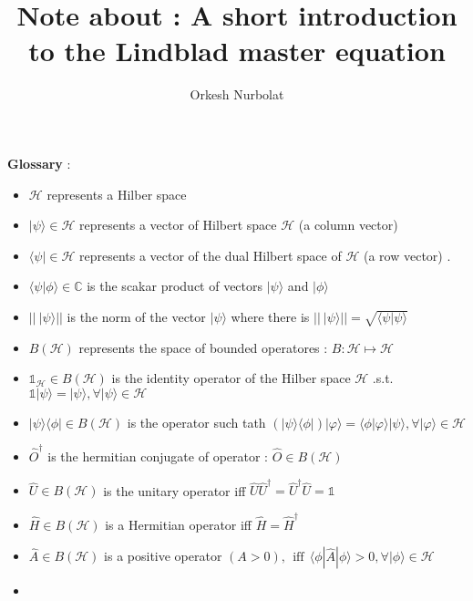 \title{Note about : A short introduction to the Lindblad master equation}
\author{Orkesh Nurbolat}
\maketitle
 \textbf{Glossary} : \\  
\begin{itemize}
\item 
 $ \mathcal{H } $  represents a Hilber space 
\item 
 $ |\psi \rangle \in \mathcal{H } $  represents a vector of Hilbert space
 $ \mathcal{H } $   (a column vector)
\item 
 $ \langle \psi |\in \mathcal{H } $  represents a vector of the dual Hilbert space of  
 $ \mathcal{H } $   (a row vector) . 
\item 
 $ {\langle \psi |\phi \rangle}\in \mathds{C } $  is the scakar product of vectors 
 $ |\psi \rangle  $  and
 $ |\phi \rangle  $ \item 
 $  ||\ |\psi \rangle ||  $  is the norm of the vector 
 $ |\psi \rangle  $  where there is 
 $  ||\ |\psi \rangle || =\sqrt{{\langle \psi |\psi \rangle}} $ \item 
 $ B (\mathcal{H }) $  represents the space of bounded operatores : 
 $ B :\mathcal{H }\mapsto \mathcal{H } $ \item 
 $ \mathds{1}_{\mathcal{H }}\in B (\mathcal{H }) $  is the identity operator of the Hilber space
 $ \mathcal{H } $  .s.t.
 $ \mathds{1}|\psi \rangle =|\psi \rangle ,\forall |\psi \rangle \in \mathcal{H } $ \item 
 $ |\psi \rangle \langle \phi |\in B (\mathcal{H }) $  is the operator such tath 
 $ (|\psi \rangle \langle \phi |)|\varphi \rangle ={\langle \phi |\varphi \rangle}|\psi \rangle ,\forall |\varphi \rangle \in \mathcal{H } $ \item 
 $ \hat{O }^\dagger  $  is the hermitian conjugate of operator : 
 $ \hat{O }\in B (\mathcal{H }) $ \item
 $ \hat{U }\in B (\mathcal{H }) $  is the unitary operator iff  
 $ \hat{U }\hat{U }^\dagger =\hat{U }^\dagger \hat{U }=\mathds{1} $ \item 
 $ \hat{H }\in B (\mathcal{H }) $  is a Hermitian operator iff  
 $ \hat{H }=\hat{H }^\dagger  $ \item
 $ \hat{A }\in B (\mathcal{H }) $  is a positive operator 
 $ (A >0),\ \ \text{iff}\ \ \langle \phi |\hat{A }|\phi \rangle >0,\forall |\phi \rangle \in \mathcal{H } $ \item 

\end{itemize}

